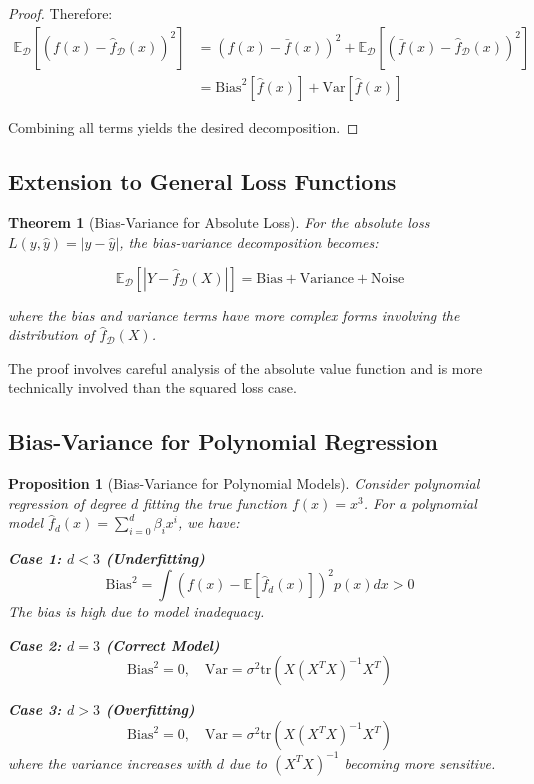 \documentclass[12pt, a4paper]{article}
\newtheorem{theorem}{Theorem}
\newtheorem{proposition}{Proposition}
\begin{document}
\begin{proof}
Therefore:
\begin{align}
\mathbb{E}_{\mathcal{D}}[(f(x) - \hat{f}_{\mathcal{D}}(x))^2] &= (f(x) - \bar{f}(x))^2 + \mathbb{E}_{\mathcal{D}}[(\bar{f}(x) - \hat{f}_{\mathcal{D}}(x))^2] \\
&= \text{Bias}^2[\hat{f}(x)] + \text{Var}[\hat{f}(x)]
\end{align}

Combining all terms yields the desired decomposition.
\end{proof}

\subsection{Extension to General Loss Functions}

\begin{theorem}[Bias-Variance for Absolute Loss]
For the absolute loss $L(y, \hat{y}) = |y - \hat{y}|$, the bias-variance decomposition becomes:

\begin{equation}
\mathbb{E}_{\mathcal{D}}[|Y - \hat{f}_{\mathcal{D}}(X)|] = \text{Bias} + \text{Variance} + \text{Noise}
\end{equation}

where the bias and variance terms have more complex forms involving the distribution of $\hat{f}_{\mathcal{D}}(X)$.
\end{theorem}

The proof involves careful analysis of the absolute value function and is more technically involved than the squared loss case.

\subsection{Bias-Variance for Polynomial Regression}

\begin{proposition}[Bias-Variance for Polynomial Models]
Consider polynomial regression of degree $d$ fitting the true function $f(x) = x^3$. For a polynomial model $\hat{f}_d(x) = \sum_{i=0}^d \beta_i x^i$, we have:

\textbf{Case 1: $d < 3$ (Underfitting)}
\begin{equation}
\text{Bias}^2 = \int (f(x) - \mathbb{E}[\hat{f}_d(x)])^2 p(x) dx > 0
\end{equation}
The bias is high due to model inadequacy.

\textbf{Case 2: $d = 3$ (Correct Model)}
\begin{equation}
\text{Bias}^2 = 0, \quad \text{Var} = \sigma^2 \text{tr}(X(X^TX)^{-1}X^T)
\end{equation}

\textbf{Case 3: $d > 3$ (Overfitting)}
\begin{equation}
\text{Bias}^2 = 0, \quad \text{Var} = \sigma^2 \text{tr}(X(X^TX)^{-1}X^T)
\end{equation}
where the variance increases with $d$ due to $(X^TX)^{-1}$ becoming more sensitive.
\end{proposition}
\end{document}
